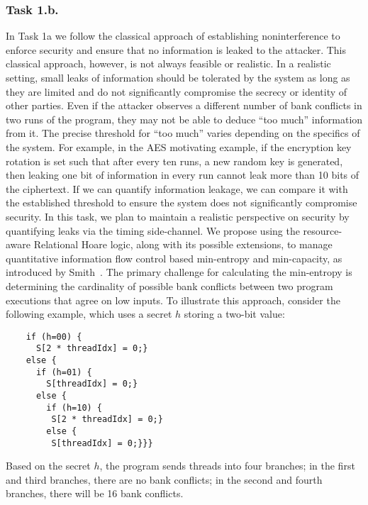 \subsubsection{Task 1.b.}
In Task 1a we follow the classical approach of establishing noninterference to enforce security and ensure that no information is leaked to the attacker. This classical approach, however, is not always feasible or realistic. 
%
In a realistic setting, small leaks of information should be tolerated by the system as long as they are limited and do not significantly compromise the secrecy or identity of other parties.
% 
Even if the attacker observes a different number of bank conflicts in two runs of the program, they may not be able to deduce ``too much'' information from it. 
%
The precise threshold for “too much'' varies depending on the specifics of the system. 
%
For example, in the AES motivating example, if the encryption key rotation is set such that after every ten runs, a new random key is generated, then leaking one bit of information in every run cannot leak more than 10 bits of the ciphertext.
%
If we can quantify information leakage, we can compare it with the established threshold to ensure the system does not significantly compromise security.
%
In this task, we plan to maintain a realistic perspective on security by quantifying leaks via the timing side-channel.
%
We propose using the resource-aware Relational Hoare logic, along with its possible extensions, to manage quantitative information flow control based  min-entropy and min-capacity, as introduced by Smith~\cite{smith2011ICQE}.
%
The primary challenge for calculating the min-entropy is determining the cardinality of possible bank conflicts between two program executions that agree on low inputs.
%
To illustrate this approach, consider the following example, which uses a secret $h$ storing a two-bit value:
\begin{lstlisting}
    if (h=00) {
      S[2 * threadIdx] = 0;} 
    else {
      if (h=01) {
        S[threadIdx] = 0;}
      else {
        if (h=10) {
         S[2 * threadIdx] = 0;}
        else {
         S[threadIdx] = 0;}}}
\end{lstlisting}
Based on the secret $h$, the program sends threads into four branches; in the first and third branches, there are no bank conflicts; in the second and fourth branches, there will be 16 bank conflicts. 
